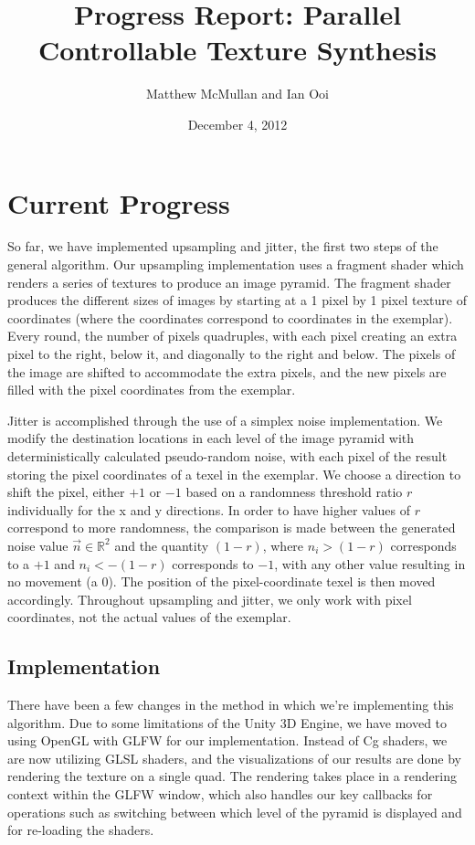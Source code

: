 \documentclass[12pt]{article}
\title{Progress Report: Parallel Controllable Texture Synthesis}
\author{Matthew McMullan and Ian Ooi}
\date{December 4, 2012}
\begin{document}
    \maketitle
    \section{Current Progress}
        So far, we have implemented upsampling and jitter, the first two steps of the general algorithm.  Our upsampling implementation uses a fragment shader which renders a series of textures to produce an image pyramid.  The fragment shader produces the different sizes of images by starting at a 1 pixel by 1 pixel texture of coordinates (where the coordinates correspond to coordinates in the exemplar).  Every round, the number of pixels quadruples, with each pixel creating an extra pixel to the right, below it, and diagonally to the right and below.  The pixels of the image are shifted to accommodate the extra pixels, and the new pixels are filled with the pixel coordinates from the exemplar.
        
      Jitter is accomplished through the use of a simplex noise implementation. We modify the destination locations in each level of the image pyramid with deterministically calculated pseudo-random noise, with each pixel of the result storing the pixel coordinates of a texel in the exemplar.  We choose a direction to shift the pixel, either $+1$ or $-1$ based on a randomness threshold ratio $r$ individually for the x and y directions.  In order to have higher values of $r$ correspond to more randomness, the comparison is made between the generated noise value $\vec{n} \in \mathbb{R}^2$ and the quantity $\left(1 - r \right)$, where $n_i > (1-r)$ corresponds to a $+1$ and $n_i < -(1-r)$ corresponds to $-1$, with any other value resulting in no movement (a $0$).  The position of the pixel-coordinate texel is then moved accordingly.  Throughout upsampling and jitter, we only work with pixel coordinates, not the actual values of the exemplar.
        
        \subsection{Implementation}
            There have been a few changes in the method in which we're implementing this algorithm.  Due to some limitations of the Unity 3D Engine, we have moved to using OpenGL with GLFW for our implementation.  Instead of Cg shaders, we are now utilizing GLSL shaders, and the visualizations of our results are done by rendering the texture on a single quad.  The rendering takes place in a rendering context within the GLFW window, which also handles our key callbacks for operations such as switching between which level of the pyramid is displayed and for re-loading the shaders.
\end{document}
